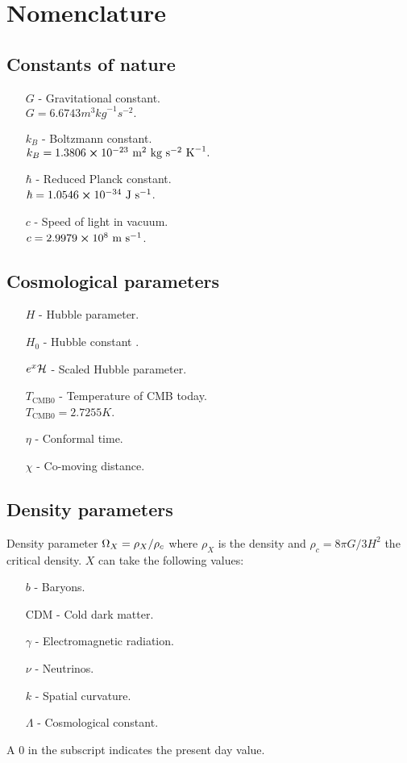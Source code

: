\section*{Nomenclature}

\subsection*{Constants of nature}
\begin{itemize}
    \item[$G$] - Gravitational constant.\\
            $G=6.6743$$\unit{m}^3\unit{kg}^{-1}\unit{s}^{-2}.$
    \item[$k_B$] - Boltzmann constant.\\
            $k_B = 1.3806\cross10^{-23}\text{ {m}}^2\text{ {kg}}\text{ {s}}^{-2}\text{ {K}}^{-1}.$
    \item[$\hbar$] - Reduced Planck constant.\\
            $\hbar = 1.0546\cross10^{-34}\text{ {J}}\text{ {s}}^{-1}$.
    \item[$c$] - Speed of light in vacuum.\\
            $c=2.9979 \cross10^8\text{ {m}}\text{ {s}}^{-1}$.
\end{itemize}

\subsection*{Cosmological parameters}
\begin{itemize}
    \item[$H$] - Hubble parameter.
    \item[$H_0$] - Hubble constant .
    \item[$e^{x}\mathcal{H}$]  - Scaled Hubble parameter.
    \item[$T_{\mathrm{CMB}0}$] - Temperature of CMB today.\\
            $T_{\mathrm{CMB}0} = 2.7255\unit{K}$. 
    \item[$\eta$] - Conformal time.
    \item[$\chi$] - Co-moving distance. 
\end{itemize}

\subsection*{Density parameters}
Density parameter $\Omega_X = \rho_X/\rho_c$ where $\rho_X$ is the density and $\rho_c=8\pi G/3H^2$ the critical density. $X$ can take the following values:
\begin{itemize}
    \item[$b$] - Baryons.
    \item[CDM] - Cold dark matter.
    \item[$\gamma$] - Electromagnetic radiation.
    \item[$\nu$] - Neutrinos.
    \item[$k$] - Spatial curvature.
    \item[$\Lambda$] - Cosmological constant.
\end{itemize}
A $0$ in the subscript indicates the present day value. 